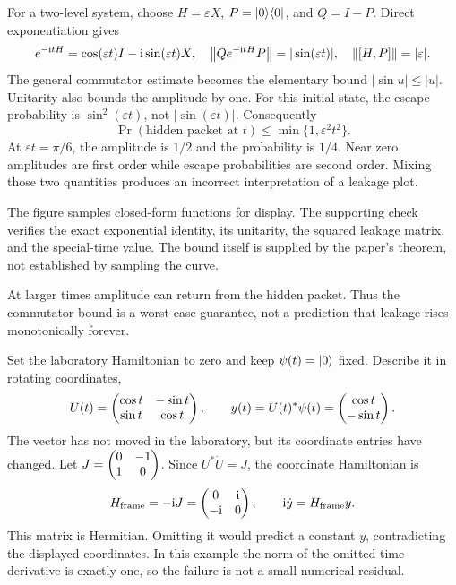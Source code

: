 For a two-level system, choose $H=\varepsilon X$, $P=\lvert 0\rangle\langle 0\rvert$, and $Q=I-P$. Direct exponentiation gives
\[
e^{-\mathrm i tH}=\cos(\varepsilon t)I-\mathrm i\sin(\varepsilon t)X,
\quad
\left\lVert Qe^{-\mathrm i tH}P\right\rVert=|\sin(\varepsilon t)|,
\quad\left\lVert[H,P]\right\rVert=|\varepsilon|.
\]
The general commutator estimate becomes the elementary bound $|\sin u|\le |u|$. Unitarity also bounds the amplitude by one.
For this initial state, the escape probability is $\sin^2(\varepsilon t)$, not $|\sin(\varepsilon t)|$. Consequently
\[
\Pr(\text{hidden packet at }t)\le\min\{1,\varepsilon^2t^2\}.
\]
At $\varepsilon t=\pi/6$, the amplitude is $1/2$ and the probability is $1/4$. Near zero, amplitudes are first order while escape probabilities are second order. Mixing those two quantities produces an incorrect interpretation of a leakage plot.

The figure samples closed-form functions for display. The supporting check verifies the exact exponential identity, its unitarity, the squared leakage matrix, and the special-time value. The bound itself is supplied by the paper's theorem, not established by sampling the curve.

At larger times amplitude can return from the hidden packet. Thus the commutator bound is a worst-case guarantee, not a prediction that leakage rises monotonically forever.

Set the laboratory Hamiltonian to zero and keep $\psi(t)=\lvert 0\rangle$ fixed. Describe it in rotating coordinates,
\[
U(t)=\begin{pmatrix}\cos t&-\sin t\\\sin t&\cos t\end{pmatrix},
\qquad y(t)=U(t)^*\psi(t)=\begin{pmatrix}\cos t\\-\sin t\end{pmatrix}.
\]
The vector has not moved in the laboratory, but its coordinate entries have changed.
Let $J=\begin{pmatrix}0&-1\\1&0\end{pmatrix}$. Since $U^*\dot U=J$, the coordinate Hamiltonian is
\[
H_{\rm frame}=-\mathrm i J=\begin{pmatrix}0&\mathrm i\\-\mathrm i&0\end{pmatrix},
\qquad \mathrm i\dot y=H_{\rm frame}y.
\]
This matrix is Hermitian. Omitting it would predict a constant $y$, contradicting the displayed coordinates. In this example the norm of the omitted time derivative is exactly one, so the failure is not a small numerical residual.

